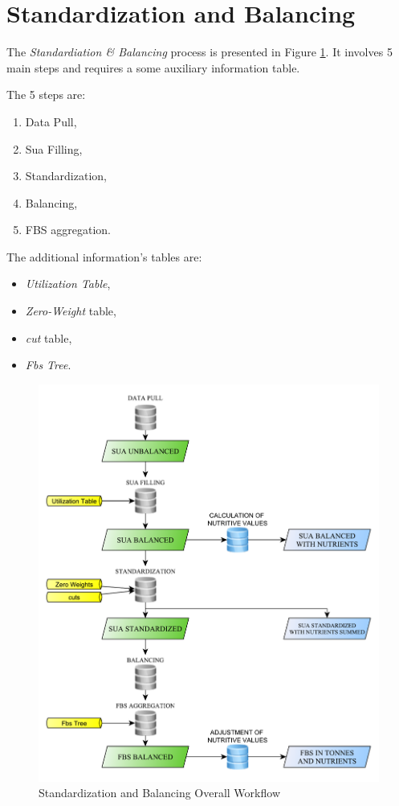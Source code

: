 \documentclass[]{article}
\providecommand{\tightlist}{%
  \setlength{\itemsep}{0pt}\setlength{\parskip}{0pt}}
\begin{document}
\section*{Standardization and
Balancing}\label{standardization-and-balancing}

The \emph{Standardiation \& Balancing} process is presented in Figure
\ref{fig:f9}. It involves 5 main steps and requires a some auxiliary
information table.

The 5 steps are:

\begin{enumerate}
\def\labelenumi{\arabic{enumi}.}
\tightlist
\item
  Data Pull,
\item
  Sua Filling,
\item
  Standardization,
\item
  Balancing,
\item
  FBS aggregation.
\end{enumerate}

The additional information's tables are:

\begin{itemize}
\tightlist
\item
  \emph{Utilization Table},
\item
  \emph{Zero-Weight} table,
\item
  \emph{cut} table,
\item
  \emph{Fbs Tree}.
\end{itemize}

\begin{figure}[H]

{\centering \includegraphics[width=0.8\linewidth]{images/StandBal/09_overall} 

}

\caption{\label{fig:f9}Standardization and Balancing Overall Workflow}\label{fig:f9}
\end{figure}
\end{document}
